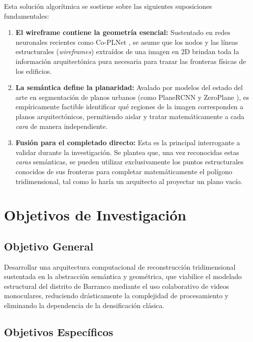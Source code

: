 Esta solución algorítmica se sostiene sobre las siguientes suposiciones fundamentales:
\begin{enumerate}
    \item \textbf{El wireframe contiene la geometría esencial:} Sustentado en redes neuronales recientes como Co-PLNet \cite{wang2026coplnet}, se asume que los nodos y las líneas estructurales (\textit{wireframes}) extraídos de una imagen en 2D brindan toda la información arquitectónica pura necesaria para trazar las fronteras físicas de los edificios.
    \item \textbf{La semántica define la planaridad:} Avalado por modelos del estado del arte en segmentación de planos urbanos (como PlaneRCNN \cite{liu2019planercnn} y ZeroPlane \cite{liu2025zeroplane}), es empíricamente factible identificar qué regiones de la imagen corresponden a planos arquitectónicos, permitiendo aislar y tratar matemáticamente a cada \textit{cara} de manera independiente.
    \item \textbf{Fusión para el completado directo:} Esta es la principal interrogante a validar durante la investigación. Se plantea que, una vez reconocidas estas \textit{caras} semánticas, se pueden utilizar exclusivamente los puntos estructurales conocidos de sus fronteras para completar matemáticamente el polígono tridimensional, tal como lo haría un arquitecto al proyectar un plano vacío.
\end{enumerate}

\section{Objetivos de Investigación}

\subsection{Objetivo General}

Desarrollar una arquitectura computacional de reconstrucción tridimensional sustentada en la abstracción semántica y geométrica, que viabilice el modelado estructural del distrito de Barranco mediante el uso colaborativo de videos monoculares, reduciendo drásticamente la complejidad de procesamiento y eliminando la dependencia de la densificación clásica.

\subsection{Objetivos Específicos}

